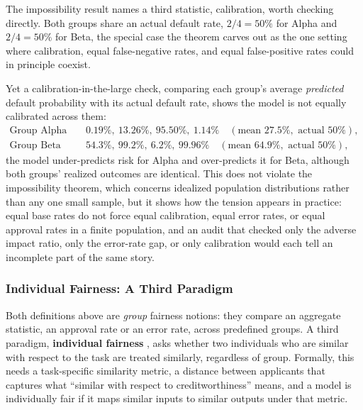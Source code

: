 \documentclass[../ai_in_finance]{subfiles}
\begin{document}
The impossibility result names a third statistic, calibration, worth checking directly. Both groups share an actual default rate, $2/4=50\%$ for Alpha and $2/4=50\%$ for Beta, the special case the theorem carves out as the one setting where calibration, equal false-negative rates, and equal false-positive rates could in principle coexist.

Yet a calibration-in-the-large check, comparing each group's average \emph{predicted} default probability with its actual default rate, shows the model is not equally calibrated across them:
\begin{align*}
\text{Group Alpha predictions:} &\quad 0.19\%,\ 13.26\%,\ 95.50\%,\ 1.14\% \quad (\text{mean } 27.5\%, \text{ actual } 50\%), \\
\text{Group Beta predictions:} &\quad 54.3\%,\ 99.2\%,\ 6.2\%,\ 99.96\% \quad (\text{mean } 64.9\%, \text{ actual } 50\%),
\end{align*}
the model under-predicts risk for Alpha and over-predicts it for Beta, although both groups' realized outcomes are identical. This does not violate the impossibility theorem, which concerns idealized population distributions rather than any one small sample, but it shows how the tension appears in practice: equal base rates do not force equal calibration, equal error rates, or equal approval rates in a finite population, and an audit that checked only the adverse impact ratio, only the error-rate gap, or only calibration would each tell an incomplete part of the same story.

\subsubsection*{Individual Fairness: A Third Paradigm}

Both definitions above are \emph{group} fairness notions: they compare an aggregate statistic, an approval rate or an error rate, across predefined groups. A third paradigm, \textbf{individual fairness} \parencite{dwork2012fairness}, asks whether two individuals who are similar with respect to the task are treated similarly, regardless of group. Formally, this needs a task-specific similarity metric, a distance between applicants that captures what ``similar with respect to creditworthiness'' means, and a model is individually fair if it maps similar inputs to similar outputs under that metric.
\end{document}
